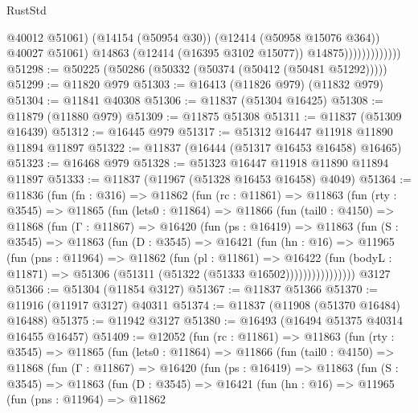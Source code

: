 \begin{lexlean}{RustStd}
\begin{coremodule}
{\begin{coremodule}
{{{{{{{{{{{{{{{{{{{{{{{{{{{{{{{{{{{{{{{{{{{{{{{{{{                                  @40012
                                  @51061)
                                (@14154 (@50954 @30))
                                (@12414 (@50958 @15076 @364))
                                @40027
                                @51061)
                              @14863
                              (@12414 (@16395 @3102 @15077))
                              @14875)))))))))))))
@51298 := @50225 (@50286 (@50332 (@50374 (@50412 (@50481 @51292)))))
@51299 := @11820 @979
@51303 := @16413 (@11826 @979) (@11832 @979)
@51304 := @11841 @40308
@51306 := @11837 (@51304 @16425)
@51308 := @11879 (@11880 @979)
@51309 := @11875 @51308
@51311 := @11837 (@51309 @16439)
@51312 := @16445 @979
@51317 := @51312 @16447 @11918 @11890 @11894 @11897
@51322 := @11837 (@16444 (@51317 @16453 @16458) @16465)
@51323 := @16468 @979
@51328 := @51323 @16447 @11918 @11890 @11894 @11897
@51333 := @11837 (@11967 (@51328 @16453 @16458) @4049)
@51364 := @11836
    (fun (fn : @316) =>
    @11862
      (fun (rc : @11861) =>
      @11863
        (fun (rty : @3545) =>
        @11865
          (fun (lets0 : @11864) =>
          @11866
            (fun (tail0 : @4150) =>
            @11868
              (fun (Γ : @11867) =>
              @16420
                (fun (ps : @16419) =>
                @11863
                  (fun (S : @3545) =>
                  @11863
                    (fun (D : @3545) =>
                    @16421
                      (fun (hn : @16) =>
                      @11965
                        (fun (pns : @11964) =>
                        @11862
                          (fun (pl : @11861) =>
                          @16422
                            (fun (bodyL : @11871) =>
                            @51306 (@51311 (@51322 (@51333 @16502))))))))))))))))
    @3127
@51366 := @51304 (@11854 @3127)
@51367 := @11837 @51366
@51370 := @11916 (@11917 @3127) @40311
@51374 := @11837 (@11908 (@51370 @16484) @16488)
@51375 := @11942 @3127
@51380 := @16493 (@16494 @51375 @40314 @16455 @16457)
@51409 := @12052
    (fun (rc : @11861) =>
    @11863
      (fun (rty : @3545) =>
      @11865
        (fun (lets0 : @11864) =>
        @11866
          (fun (tail0 : @4150) =>
          @11868
            (fun (Γ : @11867) =>
            @16420
              (fun (ps : @16419) =>
              @11863
                (fun (S : @3545) =>
                @11863
                  (fun (D : @3545) =>
                  @16421
                    (fun (hn : @16) =>
                    @11965
                      (fun (pns : @11964) =>
                      @11862
}}}}}}}}}}}}}}}}}}}}}}}}}}}}}}}}}}}}}}}}}}}}}}}}}}
\end{coremodule}}
\end{coremodule}
\end{lexlean}
